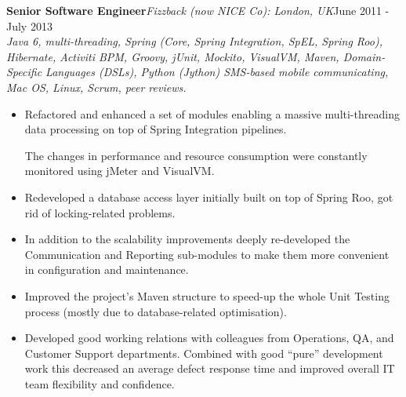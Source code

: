 \documentclass{res}
\newcommand{\jobdes}[4]{\needspace{3\baselineskip}%
{\noindent \bf #3\hspace{2ex}}{{\em \small #1}}{\hfill #2}\\{{\it \small #4.}}}
\newif\ifFullVersion
\begin{document}
\begin{resume}
\jobdes{Fizzback (now NICE Co): London, UK} {June 2011 - July 2013}{Senior Software Engineer}
{Java 6, multi-threading, Spring (Core, Spring Integration, SpEL, Spring Roo), Hibernate, Activiti BPM, Groovy, jUnit, Mockito, VisualVM, Maven, Domain-Specific Languages (DSLs), Python (Jython) SMS-based mobile communicating, Mac OS, Linux, Scrum, peer reviews}
\begin{itemize} \itemsep -2pt %
 \item Refactored and enhanced a set of modules enabling a massive multi-threading data processing on top of Spring Integration pipelines.
\ifFullVersion
While for some modules it was enough to re-code the critical pieces with the standard “stateless or immutable” approach, the main part of existed system required deep re-design based on Enterprise Integration Patterns (EIP) messaging-based architecture and extensive use of Java multi-threading tools.
\fi
The changes in performance and resource consumption were constantly monitored using jMeter and VisualVM.
 \item Redeveloped a database access layer initially built on top of Spring Roo, got rid of locking-related problems.
\ifFullVersion
Some modules were completely re-built until the required level of performance and reliability was achieved.
\fi
 \item In addition to the scalability improvements deeply re-developed the Communication and Reporting sub-modules to make them more convenient in configuration and maintenance.
\ifFullVersion
   These changes (like introducing ad-hoc configuration DSL and flexible report templates) greatly improved overall system's maintainability and customer provisioning time.
\fi
 \item 	Improved the project’s Maven structure to speed-up the whole Unit Testing process (mostly due to database-related optimisation).
\ifFullVersion
Initiated use of CI service (Jenkins) as a key component of the team’s Scrum Agile methodology approach.
\fi
 \item Developed good working relations with colleagues from Operations, QA, and Customer Support departments. Combined with good ``pure'' development work this decreased an average defect response time and improved overall IT team flexibility and confidence.
\end{itemize}


\end{resume}
\end{document}
